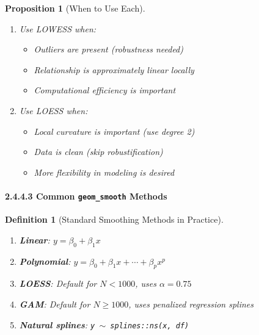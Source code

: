 \documentclass{article}
\newtheorem{definition}{Definition}
\newtheorem{proposition}{Proposition}
\begin{document}
\begin{proposition}[When to Use Each]
\begin{enumerate}
    \item Use LOWESS when:
        \begin{itemize}
            \item Outliers are present (robustness needed)
            \item Relationship is approximately linear locally
            \item Computational efficiency is important
        \end{itemize}
    \item Use LOESS when:
        \begin{itemize}
            \item Local curvature is important (use degree 2)
            \item Data is clean (skip robustification)
            \item More flexibility in modeling is desired
        \end{itemize}
\end{enumerate}
\end{proposition}

\paragraph{2.4.4.3 Common \texttt{geom\_smooth} Methods}

\begin{definition}[Standard Smoothing Methods in Practice]
\begin{enumerate}
    \item \textbf{Linear}: $y = \beta_0 + \beta_1x$
    \item \textbf{Polynomial}: $y = \beta_0 + \beta_1x + \cdots + \beta_px^p$
    \item \textbf{LOESS}: Default for $N < 1000$, uses $\alpha = 0.75$
    \item \textbf{GAM}: Default for $N \geq 1000$, uses penalized regression splines
    \item \textbf{Natural splines}: \texttt{y $\sim$ splines::ns(x, df)}
\end{enumerate}
\end{definition}
\end{document}
